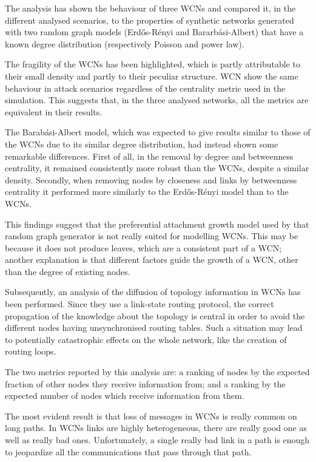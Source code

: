 \documentclass[a4paper,11pt,twoside,openright]{memoir}
\begin{document}
The analysis has shown the behaviour of three WCNs and compared it, in the
different analysed scenarios, to the properties of synthetic networks
generated with two random graph models (Erd\H{o}s-Rényi and Bararbási-Albert)
that have a known degree distribution (respectively Poisson and power law).

The fragility of the WCNs has been highlighted, which is partly attributable
to their small density and partly to their peculiar structure. WCN show the
same behaviour in attack scenarios regardless of the centrality metric used
in the simulation. This suggests that, in the three analysed
networks, all the metrics are equivalent in their results.

The Barabási-Albert model, which was expected to give results similar to
those of the WCNs due to its similar degree distribution, had instead shown
some remarkable differences. First of all, in the removal by degree and
betweenness centrality, it remained consistently more robust than the WCNs,
despite a similar density. Secondly, when removing nodes by closeness and
links by betweenness centrality it performed more similarly to the
Erd\H{o}s-Rényi model than to the WCNs.

This findings suggest that the preferential attachment growth model used by
that random graph generator is not really suited for modelling WCNs.
This may be because it does not produce leaves, which are a consistent part
of a WCN; another explanation is that different factors guide the growth of
a WCN, other than the degree of existing nodes.

Subsequently, an analysis of the diffusion of topology information in WCNs
has been performed. Since they use a link-state routing protocol, the correct
propagation of the knowledge about the topology is central in order to avoid
the different nodes having unsynchronised routing tables. Such a situation
may lead to potentially catastrophic effects on the whole network, like the
creation of routing loops.

The two metrics reported by this analysis are: a ranking of nodes by the expected
fraction of other nodes they receive information from; and a ranking by the
expected number of nodes which receive information from them.

The most evident result is that loss
of messages in WCNs is really common on long paths. In WCNs links are highly
heterogeneous, there are really good one as well as really bad ones.
Unfortunately, a single really bad link in a path is enough to jeopardize
all the communications that pass through that path.
\end{document}
